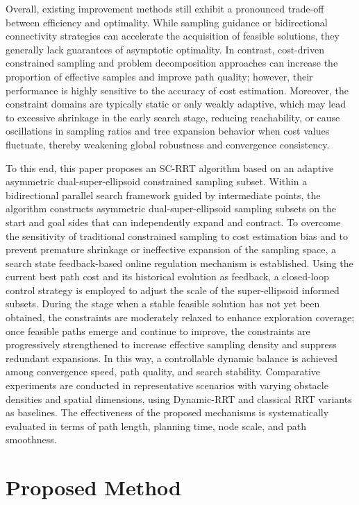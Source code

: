 \documentclass[sn-mathphys-num]{sn-jnl}%
\begin{document}
Overall, existing improvement methods still exhibit a pronounced trade-off between efficiency and optimality. While sampling guidance or bidirectional connectivity strategies can accelerate the acquisition of feasible solutions, they generally lack guarantees of asymptotic optimality. In contrast, cost-driven constrained sampling and problem decomposition approaches can increase the proportion of effective samples and improve path quality; however, their performance is highly sensitive to the accuracy of cost estimation. Moreover, the constraint domains are typically static or only weakly adaptive, which may lead to excessive shrinkage in the early search stage, reducing reachability, or cause oscillations in sampling ratios and tree expansion behavior when cost values fluctuate, thereby weakening global robustness and convergence consistency.

To this end, this paper proposes an SC-RRT algorithm based on an adaptive asymmetric dual-super-ellipsoid constrained sampling subset. Within a bidirectional parallel search framework guided by intermediate points, the algorithm constructs asymmetric dual-super-ellipsoid sampling subsets on the start and goal sides that can independently expand and contract. To overcome the sensitivity of traditional constrained sampling to cost estimation bias and to prevent premature shrinkage or ineffective expansion of the sampling space, a search state feedback-based online regulation mechanism is established. Using the current best path cost and its historical evolution as feedback, a closed-loop control strategy is employed to adjust the scale of the super-ellipsoid informed subsets. During the stage when a stable feasible solution has not yet been obtained, the constraints are moderately relaxed to enhance exploration coverage; once feasible paths emerge and continue to improve, the constraints are progressively strengthened to increase effective sampling density and suppress redundant expansions. In this way, a controllable dynamic balance is achieved among convergence speed, path quality, and search stability. Comparative experiments are conducted in representative scenarios with varying obstacle densities and spatial dimensions, using Dynamic-RRT and classical RRT variants as baselines. The effectiveness of the proposed mechanisms is systematically evaluated in terms of path length, planning time, node scale, and path smoothness. 

\section{Proposed Method}\label{sec2}
\end{document}
